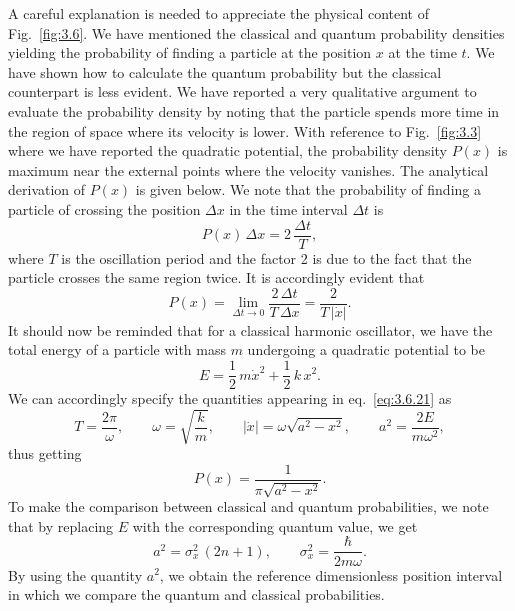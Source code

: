 \medskip
{} A careful explanation is needed to
appreciate the physical content of Fig.~\ref{fig:3.6}. We have
mentioned the classical and quantum probability densities yielding
the probability of finding a particle at the position $x$ at the
time $t$. We have shown how to calculate the quantum probability
but the classical counterpart is less evident. We have reported a
very qualitative argument to evaluate the probability density by
noting that the particle spends more time in the region of space
where its velocity is lower. With reference to Fig.~\ref{fig:3.3}
where we have reported the quadratic potential, the probability
density $P(x)$ is maximum near the external points where the
velocity vanishes. The analytical derivation of $P(x)$ is given
below. We note that the probability of finding a particle of
crossing the position $\Delta x$ in the time interval $\Delta t$ is
\begin{equation}
P(x)\,\Delta x=2\,\frac{\Delta t}{T},
\label{eq:3.6.20}
\end{equation}
where $T$ is the oscillation period and the factor 2 is due to the
fact that the particle crosses the same region twice. It is
accordingly evident that
\begin{equation}
P(x)=\lim_{\Delta t\to0}\frac{2\,\Delta t}{T\,\Delta x}
=\frac{2}{T\,|\dot x|}.
\label{eq:3.6.21}
\end{equation}
It should now be reminded that for a classical harmonic
oscillator, we have the total energy of a particle with mass $m$
undergoing a quadratic potential to be
\begin{equation}
E=\frac{1}{2}\,m\dot x^2+\frac{1}{2}\,k\,x^2.
\label{eq:3.6.22}
\end{equation}
We can accordingly specify the quantities appearing in
eq.~\eqref{eq:3.6.21} as
\[
T=\frac{2\pi}{\omega},\qquad \omega=\sqrt{\frac{k}{m}},\qquad
|\dot x|=\omega\sqrt{a^2-x^2},\qquad
a^2=\frac{2E}{m\omega^2},
\]
thus getting
\begin{equation}
P(x)=\frac{1}{\pi\sqrt{a^2-x^2}}.
\label{eq:3.6.24}
\end{equation}
To make the comparison between classical and quantum
probabilities, we note that by replacing $E$ with the
corresponding quantum value, we get
\[
a^2=\sigma_x^2\,(2n+1),\qquad \sigma_x^2=\frac{\hbar}{2m\omega}.
\]
By using the quantity $a^2$, we obtain the reference dimensionless
position interval in which we compare the quantum and classical
probabilities.

